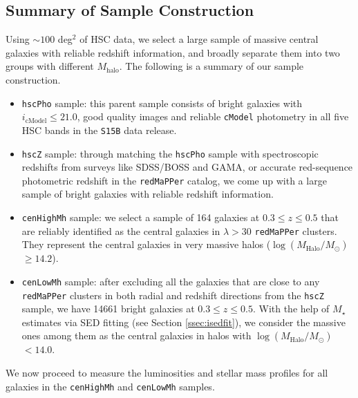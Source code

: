 \documentclass{emulateapj}
\def\redm{\texttt{redMaPPer}}
\def\rbcg{\texttt{cenHighMh}}
\def\nbcg{\texttt{cenLowMh}}
\def\mstar{{$M_{\star}$}}
\def\mhalo{{$M_{\mathrm{halo}}$}}
\def\logmh{{$\log (M_{\mathrm{Halo}}/M_{\odot})$}}
\begin{document}
\begin{CJK*}{UTF8}{gbsn}

\subsection{Summary of Sample Construction}
    \label{ssec:sample}

    Using $\sim 100$ deg$^2$ of HSC data, we select a large sample of massive central 
    galaxies with reliable redshift information, and broadly separate them into two 
    groups with different \mhalo{}. 
    The following is a summary of our sample construction.
    
    \begin{itemize}
        \item \texttt{hscPho} sample: this parent sample consists of bright galaxies 
            with $i_{\mathrm{cModel}} \leq 21.0$, good quality images and reliable 
            \texttt{cModel} photometry in all five HSC bands in the \texttt{S15B} 
            data release. 
        \item \texttt{hscZ} sample: through matching the \texttt{hscPho} sample with 
            spectroscopic redshifts from surveys like SDSS/BOSS and GAMA, or accurate 
            red-sequence photometric redshift in the \redm{} catalog, we come up with 
            a large sample of bright galaxies with reliable redshift information. 
        \item \rbcg{} sample: we select a sample of 164 galaxies at 
            $0.3 \leq z \leq 0.5$ that are reliably identified as the central galaxies 
            in $\lambda > 30$ \redm{} clusters. 
            They represent the central galaxies in very massive halos 
            (\logmh{}$\geq 14.2$). 
        \item \nbcg{} sample: after excluding all the galaxies that are close to any 
            \redm{} clusters in both radial and redshift directions from the 
            \texttt{hscZ} sample, we have 14661 bright galaxies at 
            $0.3 \leq z \leq 0.5$.
            With the help of \mstar{} estimates via SED fitting (see Section 
            \ref{ssec:isedfit}), we consider the massive ones among them as the 
            central galaxies in halos with \logmh{}$<14.0$.  
    \end{itemize}
    
    We now proceed to measure the luminosities and stellar mass profiles for 
    all galaxies in the \rbcg{} and \nbcg{} samples.


\end{CJK*}
\end{document}
